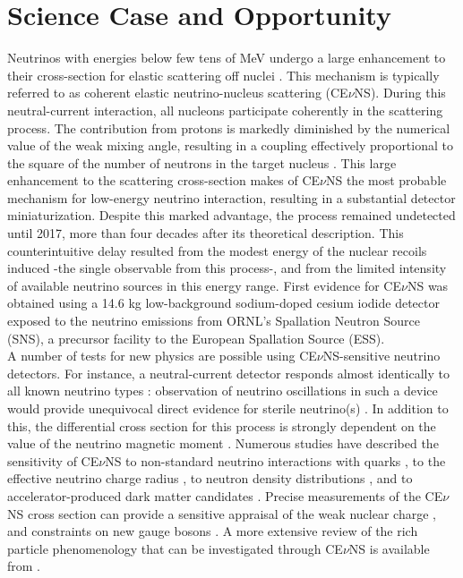 \documentclass[12pt]{article}
\begin{document}
\newpage

\section{Science Case and Opportunity}

Neutrinos with energies below few tens of MeV  undergo a large enhancement to their cross-section for  elastic scattering off nuclei \cite{freedman,leo}. This mechanism is typically referred to as coherent elastic neutrino-nucleus scattering (CE$\nu$NS). During this neutral-current interaction, all nucleons participate coherently in the scattering process. The contribution from protons is markedly diminished by the numerical value of the weak mixing angle, resulting in a coupling effectively proportional to the square of the number of neutrons in the target nucleus \cite{leo}. This large enhancement to the scattering cross-section makes of CE$\nu$NS the  most probable mechanism for low-energy neutrino interaction, resulting in a substantial  detector miniaturization. Despite this marked advantage, the process remained undetected until 2017, more than four decades after its theoretical description. This counterintuitive delay resulted from the modest energy of the nuclear recoils induced -the single observable from this process-, and from the limited intensity of available neutrino sources in this energy range. First  evidence for CE$\nu$NS \cite{science,bjorn} was obtained using a 14.6 kg low-background sodium-doped cesium iodide detector \cite{ournim} exposed to the neutrino emissions from ORNL's Spallation Neutron Source (SNS), a precursor facility to the European Spallation Source (ESS). \\

 A number of tests for new physics are possible using CE$\nu$NS-sensitive neutrino detectors. For instance, a neutral-current detector responds almost identically to all known neutrino types \cite{diff}: observation of neutrino oscillations in such a device 
would provide unequivocal direct evidence for sterile neutrino(s) \cite{leo}. In addition to this, the differential cross section for this process is strongly dependent on the value of the neutrino magnetic moment \cite{dodd}. Numerous  studies have described the sensitivity of CE$\nu$NS to non-standard neutrino interactions with quarks \cite{Barranco:2005yy,new2}, to the effective neutrino charge radius \cite{Bernabeu:2002pd}, to neutron density distributions  \cite{patton,patton2,nst1}, and to accelerator-produced dark matter candidates \cite{tayloe2}. Precise measurements of the CE$\nu$NS cross section can provide a sensitive appraisal of the weak nuclear charge \cite{larry}, and constraints on new gauge bosons \cite{shoemaker}. A more extensive review of the rich particle phenomenology that can be investigated through CE$\nu$NS is available from  \cite{ESS}.\\
\end{document}
